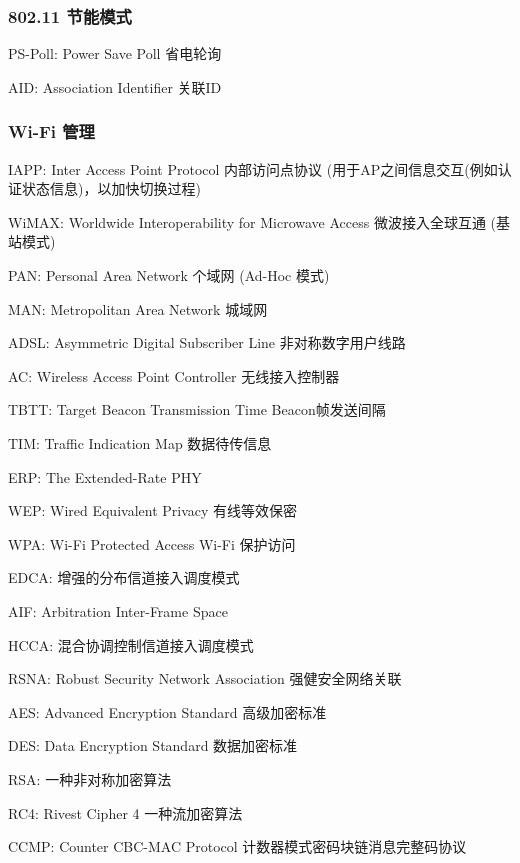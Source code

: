 \documentclass[UTF8,cs4size]{ctexart}
\begin{document}
\subsubsection{802.11 节能模式}
\begin{compactitem}
  \item PS-Poll: Power Save Poll 省电轮询
  \item AID: Association Identifier 关联ID
\end{compactitem}
\subsubsection{Wi-Fi 管理}
\begin{compactitem}
  \item IAPP: Inter Access Point Protocol 内部访问点协议 (用于AP之间信息交互(例如认证状态信息)，以加快切换过程)
  \item WiMAX: Worldwide Interoperability for Microwave Access 微波接入全球互通 (基站模式)
  \item PAN: Personal Area Network 个域网 (Ad-Hoc 模式)
  \item MAN: Metropolitan Area Network 城域网
  \item ADSL: Asymmetric Digital Subscriber Line 非对称数字用户线路
  \item AC: Wireless Access Point Controller 无线接入控制器
  \item TBTT: Target Beacon Transmission Time Beacon帧发送间隔
  \item TIM: Traffic Indication Map 数据待传信息
  \item ERP: The Extended-Rate PHY
  \item WEP: Wired Equivalent Privacy 有线等效保密
  \item WPA: Wi-Fi Protected Access Wi-Fi 保护访问
  \item EDCA: 增强的分布信道接入调度模式
  \item AIF: Arbitration Inter-Frame Space
  \item HCCA: 混合协调控制信道接入调度模式
  \item RSNA: Robust Security Network Association 强健安全网络关联
  \item AES: Advanced Encryption Standard 高级加密标准
  \item DES: Data Encryption Standard 数据加密标准
  \item RSA: 一种非对称加密算法
  \item RC4: Rivest Cipher 4 一种流加密算法
  \item CCMP: Counter CBC-MAC Protocol 计数器模式密码块链消息完整码协议
\end{compactitem}
\end{document}
